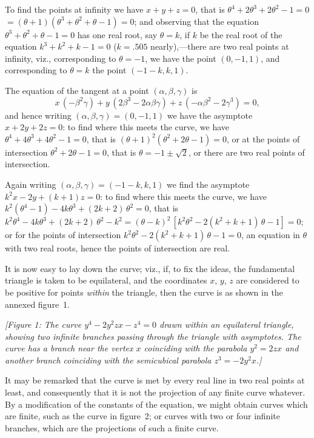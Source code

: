 \documentclass[11pt,a4paper]{article}
\begin{document}
To find the points at infinity we have $x+y+z=0$, that is $\theta^4 + 2\theta^3 + 2\theta^2 - 1 = 0$
$= (\theta+1)(\theta^3 + \theta^2 + \theta - 1) = 0$; and observing that the equation $\theta^3 + \theta^2 + \theta - 1 = 0$ has one
real root, say $\theta=k$, if $k$ be the real root of the equation $k^3+k^2+k-1=0$ ($k=.505$
nearly),---there are two real points at infinity, viz., corresponding to $\theta=-1$, we have
the point $(0, -1, 1)$, and corresponding to $\theta=k$ the point $(-1-k, k, 1)$.

The equation of the tangent at a point $(\alpha, \beta, \gamma)$ is
\[
x\,(-\beta^2\gamma) + y\,(2\beta^3 - 2\alpha\beta\gamma) + z\,(-\alpha\beta^2 - 2\gamma^3) = 0,
\]
and hence writing $(\alpha, \beta, \gamma) = (0, -1, 1)$ we have the asymptote $x+2y+2z=0$: to find
where this meets the curve, we have $\theta^4 + 4\theta^3 + 4\theta^2 - 1 = 0$, that is $(\theta+1)^2(\theta^2+2\theta-1)=0$,
or at the points of intersection $\theta^2+2\theta-1=0$, that is $\theta=-1\pm\surd2$, or there are two
real points of intersection.

Again writing $(\alpha, \beta, \gamma) = (-1-k, k, 1)$ we find the asymptote $k^2x - 2y + (k+1)z = 0$:
to find where this meets the curve, we have $k^2(\theta^4-1) - 4k\theta^3 + (2k+2)\,\theta^2 = 0$, that is
$k^2\theta^4 - 4k\theta^3 + (2k+2)\,\theta^2 - k^2 = (\theta-k)^2\,[k^2\theta^2 - 2(k^2+k+1)\,\theta - 1] = 0$; or for the points of
intersection $k^2\theta^2 - 2(k^2+k+1)\,\theta - 1 = 0$, an equation in $\theta$ with two real roots, hence
the points of intersection are real.

It is now easy to lay down the curve; viz., if, to fix the ideas, the fundamental
triangle is taken to be equilateral, and the coordinates $x$, $y$, $z$ are considered to be
positive for points \textit{within} the triangle, then the curve is as shown in the annexed
figure~1.

\begin{center}
\textit{[Figure 1: The curve $y^4 - 2y^2zx - z^4 = 0$ drawn within an equilateral triangle,
showing two infinite branches passing through the triangle with asymptotes.
The curve has a branch near the vertex $x$ coinciding with the parabola $y^2=2zx$
and another branch coinciding with the semicubical parabola $z^3=-2y^2x$.]}
\end{center}

It may be remarked that the curve is met by every real line in two real points
at least, and consequently that it is not the projection of any finite curve whatever.
By a modification of the constants of the equation, we might obtain curves which are
finite, such as the curve in figure~2; or curves with two or four infinite branches,
which are the projections of such a finite curve.
\end{document}
